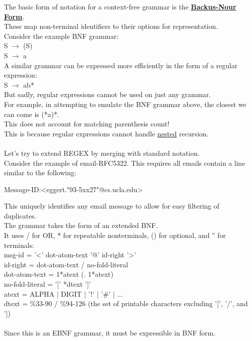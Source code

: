 \documentclass[../../lecture_notes.tex]{subfiles}
\begin{document}
\noindent The basic form of notation for a context-free grammar is the \textbf{\underline{Backus-Nour Form}}.\\
These map non-terminal identifiers to their options for representation.\\
Consider the example BNF grammar:\\
\indent S $\rightarrow$ (S)\\
\indent S $\rightarrow$ a\\
A similar grammar can be expressed more efficiently in the form of a regular expression:\\
\indent S $\rightarrow$ ab*\\
But sadly, regular expressions cannot be used on just any grammar.\\
For example, in attempting to emulate the BNF grammar above, the closest we can come is (*a)*.\\
This does not account for matching parenthesis count!\\
This is because regular expressions cannot handle \underline{nested} recursion.\\
\\
Let's try to extend REGEX by merging with standard notation.\\
Consider the example of email-RFC5322.  This requires all emails contain a line similar to the following:
\begin{center} Message-ID:<eggert."93-5xx27"@cs.ucla.edu> \end{center}
This uniquely identifies any email message to allow for easy filtering of duplicates.\\
The grammar takes the form of an extended BNF.\\
It uses / for OR, * for repeatable nonterminals, () for optional, and '' for terminals:\\
\indent msg-id = '<' dot-atom-text '@' id-right '>'\\
\indent id-right = dot-atom-text / no-fold-literal\\
\indent dot-atom-text = 1*atext (. 1*atext)\\
\indent no-fold-literal = '[' *dtext ']'\\
\indent atext = ALPHA | DIGIT | '!' | '\#' | ...\\
\indent dtext = \%33-90 / \%94-126 (the set of printable characters excluding '[', '/', and '])\\
\\
Since this is an EBNF grammar, it must be expressible in BNF form.\\
\end{document}
